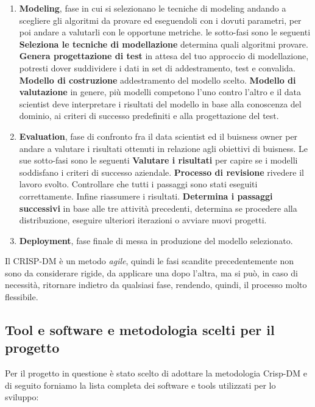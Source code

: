 \documentclass[italian,12pt,a4paper]{article}
\begin{document}
\begin{enumerate}
		\item \textbf{Modeling}, fase in cui si selezionano le tecniche di modeling andando a scegliere gli algoritmi da provare ed eseguendoli con i dovuti parametri, per poi andare a valutarli con le opportune metriche. le sotto-fasi sono le seguenti \textbf{Seleziona le tecniche di modellazione} determina quali algoritmi provare. \textbf{Genera progettazione di test} in attesa del tuo approccio di modellazione, potresti dover suddividere i dati in set di addestramento, test e convalida. \textbf{Modello di costruzione} addestramento del modello scelto. \textbf{Modello di valutazione} in genere, più modelli competono l'uno contro l'altro e il data scientist deve interpretare i risultati del modello in base alla conoscenza del dominio, ai criteri di successo predefiniti e alla progettazione del test.
		\item \textbf{Evaluation}, fase di confronto fra il data scientist ed il buisness owner per andare a valutare i risultati ottenuti in relazione agli obiettivi di buisness. Le sue sotto-fasi sono le seguenti \textbf{Valutare i risultati} per capire se i modelli soddisfano i criteri di successo aziendale. \textbf{Processo di revisione} rivedere il lavoro svolto. Controllare che tutti i passaggi sono stati eseguiti correttamente. Infine riassumere i risultati. \textbf{Determina i passaggi successivi} in base alle tre attività precedenti, determina se procedere alla distribuzione, eseguire ulteriori iterazioni o avviare nuovi progetti.
		\item \textbf{Deployment}, fase finale di messa in produzione del modello selezionato.
	\end{enumerate}

	Il CRISP-DM è un metodo \textit{agile}, quindi le fasi scandite precedentemente non sono da considerare rigide, da applicare una dopo l'altra, ma si può, in caso di necessità, ritornare indietro da qualsiasi fase, rendendo, quindi, il processo molto flessibile.

    \vspace{25pt}
    
	\subsection{Tool e software e metodologia scelti per il progetto}
	Per il progetto in questione è stato scelto di adottare la metodologia Crisp-DM e di seguito forniamo la lista completa dei software e tools utilizzati per lo sviluppo: 
	
\end{document}
